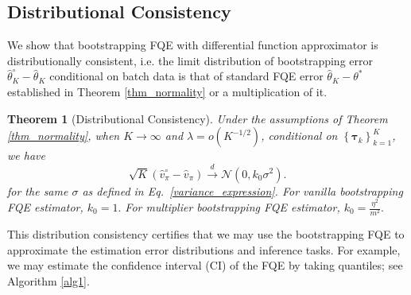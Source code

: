 \documentclass{article}
\numberwithin{equation}{section}
\theoremstyle{plain}
\newtheorem{theorem}{Theorem}[section]
\theoremstyle{definition}
\theoremstyle{remark}
\begin{document}
\subsection{Distributional Consistency}
We show that bootstrapping FQE with differential function approximator is distributionally consistent, i.e. the limit distribution of bootstrapping error $\widehat{\theta}^{\circ}_K - \widehat{\theta}_K$ conditional on batch data is that of standard FQE error $\widehat{\theta}_K - \theta^*$ established in Theorem \ref{thm_normality} or a multiplication of it.

\begin{theorem}[Distributional Consistency]\label{thm_consistency}
    Under the assumptions of Theorem \ref{thm_normality}, when $K \to \infty$ and $\lambda = o(K^{-1/2})$, conditional on $\left\{\boldsymbol{\tau}_k\right\}_{k=1}^K$, we have
    $$
    \sqrt{K} \left(\widehat{v}_{\pi}^{\circ} - \widehat{v}_{\pi}\right) \stackrel{d}{\longrightarrow} \mathcal{N}(0,k_0\sigma^2).
    $$
    for the same $\sigma$ as defined in Eq.~\eqref{variance_expression}. For vanilla bootstrapping FQE estimator, $k_0 = 1.$ For multiplier bootstrapping FQE estimator, $ k_0 = \frac{\eta^2}{m^2}.$
\end{theorem}

This distribution consistency certifies that we may use the bootstrapping FQE to approximate the estimation error distributions and inference tasks. For example, we may estimate the confidence interval (CI) of the FQE by taking quantiles; see Algorithm \ref{alg1}.
\end{document}
